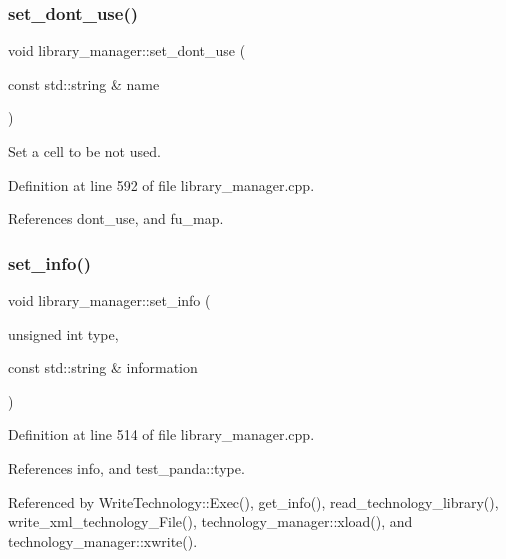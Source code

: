 \subsubsection{\texorpdfstring{set\+\_\+dont\+\_\+use()}{set\_dont\_use()}}
{\footnotesize\ttfamily void library\+\_\+manager\+::set\+\_\+dont\+\_\+use (\begin{DoxyParamCaption}\item[{const std\+::string \&}]{name }\end{DoxyParamCaption})}



Set a cell to be not used. 



Definition at line 592 of file library\+\_\+manager.\+cpp.



References dont\+\_\+use, and fu\+\_\+map.

\mbox{\label{classlibrary__manager_acdc0bce98076c59ca92b316fcb11ab13}} 
\subsubsection{\texorpdfstring{set\+\_\+info()}{set\_info()}}
{\footnotesize\ttfamily void library\+\_\+manager\+::set\+\_\+info (\begin{DoxyParamCaption}\item[{unsigned int}]{type,  }\item[{const std\+::string \&}]{information }\end{DoxyParamCaption})}



Definition at line 514 of file library\+\_\+manager.\+cpp.



References info, and test\+\_\+panda\+::type.



Referenced by Write\+Technology\+::\+Exec(), get\+\_\+info(), read\+\_\+technology\+\_\+library(), write\+\_\+xml\+\_\+technology\+\_\+\+File(), technology\+\_\+manager\+::xload(), and technology\+\_\+manager\+::xwrite().

